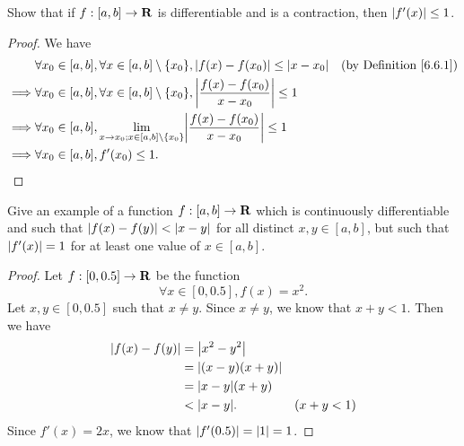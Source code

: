 \begin{exercise}\label{ex 6.6.2}
    Show that if \(f : [a, b] \to \mathbf{R}\) is differentiable and is a contraction, then \(\left\lvert f'(x)\right\rvert \leq 1\).
\end{exercise}

\begin{proof}
    We have
    \begin{align*}
                 & \forall x_0 \in [a, b], \forall x \in [a, b] \setminus \{x_0\}, \abs{f(x) - f(x_0)} \leq \abs{x - x_0}               & \text{(by Definition \ref{6.6.1})} \\
        \implies & \forall x_0 \in [a, b], \forall x \in [a, b] \setminus \{x_0\}, \abs{\frac{f(x) - f(x_0)}{x - x_0}} \leq 1                                                \\
        \implies & \forall x_0 \in [a, b], \lim_{x \to x_0 ; x \in [a, b] \setminus \{x_0\}} \abs{\frac{f(x) - f(x_0)}{x - x_0}} \leq 1                                      \\
        \implies & \forall x_0 \in [a, b], f'(x_0) \leq 1.
    \end{align*}
\end{proof}

\begin{exercise}\label{ex 6.6.3}
    Give an example of a function \(f : [a, b] \to \mathbf{R}\) which is continuously differentiable and such that \(\left\lvert f(x) - f(y)\right\rvert < \left\lvert x - y\right\rvert\) for all distinct \(x, y \in [a, b]\), but such that \(\left\lvert f'(x)\right\rvert = 1\) for at least one value of \(x \in [a, b]\).
\end{exercise}

\begin{proof}
    Let \(f : [0, 0.5] \to \mathbf{R}\) be the function
    \[
        \forall x \in [0, 0.5], f(x) = x^2.
    \]
    Let \(x, y \in [0, 0.5]\) such that \(x \neq y\).
    Since \(x \neq y\), we know that \(x + y < 1\).
    Then we have
    \begin{align*}
        \abs{f(x) - f(y)} & = \abs{x^2 - y^2}                    \\
                          & = \abs{(x - y)(x + y)}               \\
                          & = \abs{x - y} (x + y)                \\
                          & < \abs{x - y}.         & (x + y < 1)
    \end{align*}
    Since \(f'(x) = 2x\), we know that \(\left\lvert f'(0.5)\right\rvert = \left\lvert1\right\rvert = 1\).
\end{proof}

